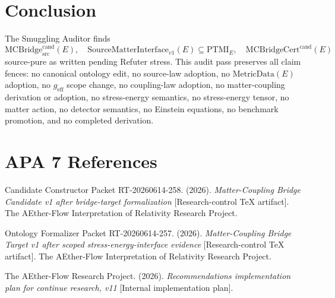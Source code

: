 \documentclass[11pt]{article}
\newcommand{\MetricData}{\mathrm{MetricData}}
\newcommand{\geff}{g_{\mathrm{eff}}}
\newcommand{\MCBridgeCand}{\mathrm{MCBridge}_{\mathrm{src}}^{\mathrm{cand}}}
\newcommand{\MCBridgeCertCand}{\mathrm{MCBridgeCert}^{\mathrm{cand}}}
\newcommand{\SMI}{\mathrm{SourceMatterInterface}_{v1}}
\newcommand{\PTMI}{\mathrm{PTMI}}
\begin{document}
\section{Conclusion}

The Smuggling Auditor finds
\[
  \MCBridgeCand(E),\quad \SMI(E)\subseteq\PTMI_E,\quad
  \MCBridgeCertCand(E)
\]
source-pure as written pending Refuter stress. This audit pass preserves all
claim fences: no canonical ontology edit, no source-law adoption, no
\(\MetricData(E)\) adoption, no \(\geff\) scope change, no coupling-law
adoption, no matter-coupling derivation or adoption, no stress-energy
semantics, no stress-energy tensor, no matter action, no detector semantics,
no Einstein equations, no benchmark promotion, and no completed derivation.

\section{APA 7 References}

Candidate Constructor Packet RT-20260614-258. (2026). \emph{Matter-Coupling
Bridge Candidate v1 after bridge-target formalization} [Research-control
TeX artifact]. The AEther-Flow Interpretation of Relativity Research
Project.

Ontology Formalizer Packet RT-20260614-257. (2026). \emph{Matter-Coupling
Bridge Target v1 after scoped stress-energy-interface evidence}
[Research-control TeX artifact]. The AEther-Flow Interpretation of
Relativity Research Project.

The AEther-Flow Research Project. (2026). \emph{Recommendations
implementation plan for continue research, v11} [Internal implementation
plan].
\end{document}
